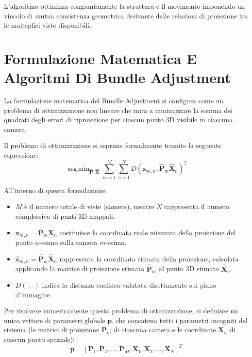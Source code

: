 ﻿\documentclass[11pt, a4paper]{article}
\DeclareMathOperator*{\argmin}{arg\,min}
\begin{document}
L'algoritmo ottimizza congiuntamente la struttura e il movimento imponendo un vincolo di mutua consistenza geometrica derivante dalle relazioni di proiezione tra le molteplici viste disponibili.

\newpage

\section{Formulazione Matematica E Algoritmi Di Bundle Adjustment}

La formulazione matematica del Bundle Adjustment si configura come un problema di ottimizzazione non lineare che mira a minimizzare la somma dei quadrati degli errori di riproiezione per ciascun punto 3D visibile in ciascuna camera.


Il problema di ottimizzazione si esprime formalmente tramite la seguente espressione:
\[ \boxed{\argmin_{\hat{\bm{P}}, \hat{\bm{X}}} \sum_{m=1}^{M} \sum_{n=1}^{N} D(\bm{x}_{m,n}, \hat{\bm{P}}_m \hat{\bm{X}}_n)^2} \]

All'interno di questa formulazione:
\begin{itemize}
    \item $M$ è il numero totale di viste (camere), mentre $N$ rappresenta il numero complessivo di punti 3D mappati.
    \item $\bm{x}_{m,n} = \bm{P}_m \bm{X}_n$ costituisce la coordinata reale misurata della proiezione del punto $n$-esimo sulla camera $m$-esima.
    \item $\hat{\bm{x}}_{m,n} = \hat{\bm{P}}_m \hat{\bm{X}}_n$ rappresenta la coordinata stimata della proiezione, calcolata applicando la matrice di proiezione stimata $\hat{\bm{P}}_m$ al punto 3D stimato $\hat{\bm{X}}_n$.
    \item $D(\cdot, \cdot)$ indica la distanza euclidea valutata direttamente sul piano d'immagine.
\end{itemize}

Per risolvere numericamente questo problema di ottimizzazione, si definisce un unico vettore di parametri globale $\bm{p}$, che concatena tutti i parametri incogniti del sistema (le matrici di proiezione $\bm{P}_m$ di ciascuna camera e le coordinate $\bm{X}_n$ di ciascun punto spaziale):
\[ \bm{p} = [\bm{P}_1, \bm{P}_2, \dots, \bm{P}_M, \bm{X}_1, \bm{X}_2, \dots, \bm{X}_N]^T \]
\end{document}
